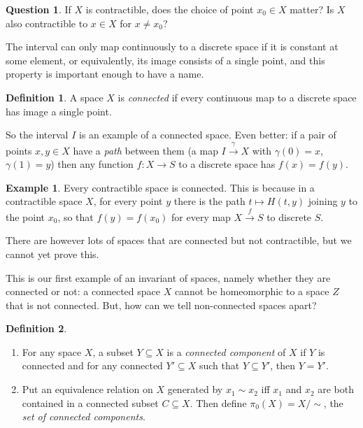 \documentclass{tufte-handout}
\newcommand{\lecturenum}[1]{\marginnote{\color{red}Lecture #1}}
\theoremstyle{definition}
\newtheorem{definition}{Definition}
\newtheorem{example}{Example}
\newtheorem{q}{Question}
\begin{document}
\begin{q}
If $X$ is contractible, does the choice of point $x_0\in X$ matter? Is $X$ also contractible
to $x\in X$ for $x\neq x_0$?
\end{q}

The interval can only map continuously to a discrete space if it is constant at some 
element, or equivalently, its image consists of a single point, and this property is 
important enough to have a name.

\begin{definition}\label{def:connected}
A space $X$ is \emph{connected} if every continuous map to a discrete space has image a single point.
\end{definition}

So the interval $I$ is an example of a connected space. Even better: if a pair of points $x,y\in X$ 
have a \emph{path} between them (a map $I\xrightarrow{\gamma} X$ with $\gamma(0) = x$, $\gamma(1)=y$)
then any function $f\colon X\to S$ to a discrete space has $f(x)=f(y)$.

\begin{example}
Every contractible space is connected. This is because in a contractible space $X$, for every point $y$ 
there is the path $t\mapsto H(t,y)$ joining $y$ to the point $x_0$, so that $f(y)=f(x_0)$ for every map 
$X\xrightarrow{f}S$ to discrete $S$.
\end{example}

There are however lots of spaces that are connected but not contractible, but we cannot 
yet prove this.



This\lecturenum{3} is our first example of an invariant of spaces,
namely whether they are connected or not: a connected space $X$ cannot be homeomorphic 
to a space $Z$ that is not connected. But, how can we tell non-connected spaces apart?

\begin{definition}
\begin{enumerate}

	\item For any space $X$, a subset $Y\subseteq X$ is a \emph{connected component} 
	of $X$ if $Y$ is connected and for any connected $Y'\subseteq X$ such that $Y\subseteq Y'$,
	then $Y= Y'$.
	
	\item Put an equivalence relation on $X$ generated
		by $x_1\sim x_2$ iff $x_1$ and $x_2$ 
		are both contained in a connected subset $C\subseteq X$. Then define 
		$\pi_0(X) = X/\sim$, the \emph{set of connected components}. 

\end{enumerate}
\end{definition}
\end{document}
